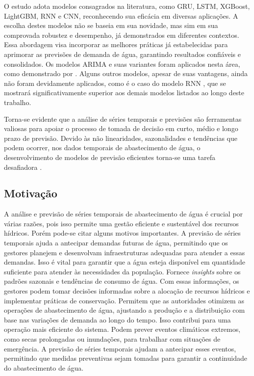 O estudo adota modelos consagrados na literatura, como GRU, LSTM, XGBoost, LightGBM, RNN e CNN, reconhecendo sua eficácia em diversas aplicações. A escolha destes modelos não se baseia em sua novidade, mas sim em sua comprovada robustez e desempenho, já demonstrados em diferentes contextos. Essa abordagem visa incorporar as melhores práticas já estabelecidas para aprimorar as previsões de demanda de água, garantindo resultados confiáveis e consolidados. Os modelos ARIMA e suas variantes foram aplicados nesta área, como demonstrado por \cite{2-s2.0-85069459067, 2-s2.0-85099424908}. Alguns outros modelos, apesar de suas vantagens, ainda não foram devidamente aplicados, como é o caso do modelo RNN \cite{2-s2.0-85067419084}, que se mostrará significativamente superior aos demais modelos listados ao longo deste trabalho.

Torna-se evidente que a análise de séries temporais e previsões são ferramentas valiosas para apoiar o processo de tomada de decisão em curto, médio e longo prazo de previsão. Devido às não linearidades, sazonalidades e tendências que podem ocorrer, nos dados temporais de abastecimento de água, o desenvolvimento de modelos de previsão eficientes torna-se uma tarefa desafiadora \cite{mateus}.



\subsection{Motiva\c c\~ao} 
\label{subsubsec:motivacao}

A análise e previsão de séries temporais de abastecimento de água é crucial por várias razões, pois isso permite uma gestão eficiente e sustentável dos recursos hídricos. Porém pode-se citar alguns motivos importantes. A previsão de séries temporais ajuda a antecipar demandas futuras de água, permitindo que os gestores planejem e desenvolvam infraestruturas adequadas para atender a essas demandas. Isso é vital para garantir que a água esteja disponível em quantidade suficiente para atender às necessidades da população. Fornece \textit{insights} sobre os padrões sazonais e tendências de consumo de água. Com essas informações, os gestores podem tomar decisões informadas sobre a alocação de recursos hídricos e implementar práticas de conservação. Permitem que as autoridades otimizem as operações de abastecimento de água, ajustando a produção e a distribuição com base nas variações de demanda ao longo do tempo. Isso contribui para uma operação mais eficiente do sistema. Podem prever eventos climáticos extremos, como secas prolongadas ou inundações, para trabalhar com situações de emergência. A previsão de séries temporais ajudam a antecipar esses eventos, permitindo que medidas preventivas sejam tomadas para garantir a continuidade do abastecimento de água.

